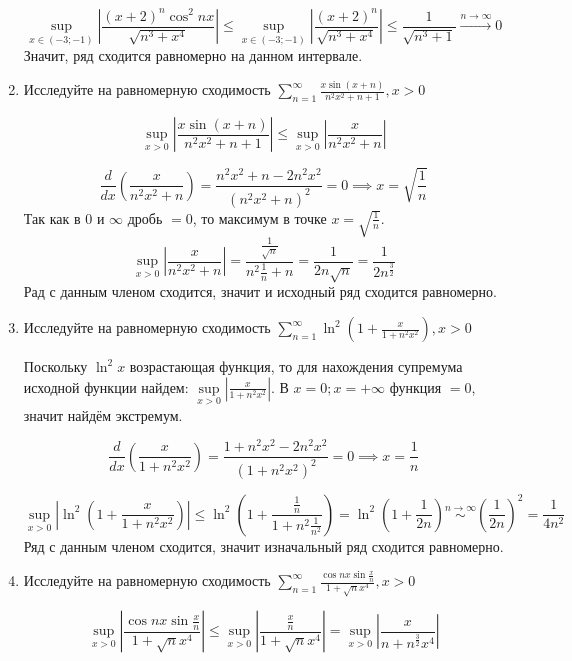\documentclass{article}
\begin{document}
\begin{large}
\begin{enumerate}
$$ \sup_{x\in(-3;-1)} \left| \frac{(x+2)^n \cos^2nx}{\sqrt{n^3 + x^4}} \right| \leq \sup_{x\in(-3;-1)} \left| \frac{(x+2)^n}{\sqrt{n^3 + x^4}} \right| \leq \frac{1}{\sqrt{n^3 + 1}} \xrightarrow{n\to\infty} 0 $$
Значит, ряд сходится равномерно на данном интервале.

\item Исследуйте на равномерную сходимость $ \sum\limits_{n=1}^{\infty} \frac{x \sin(x+n)}{n^2x^2 + n + 1}, x > 0 $

$$ \sup_{x>0} \left| \frac{x \sin(x+n)}{n^2x^2 + n + 1} \right| \leq \sup_{x>0} \left| \frac{x}{n^2x^2 + n} \right| $$

$$ \frac{d}{dx} \left( \frac{x}{n^2x^2 + n} \right) = \frac{n^2x^2 + n - 2n^2x^2}{(n^2x^2 + n)^2} = 0 \implies x = \sqrt{\frac{1}{n}}$$
Так как в $0$ и $\infty$ дробь $= 0$, то максимум в точке $x = \sqrt{\frac{1}{n}}$.
$$ \sup_{x>0} \left| \frac{x}{n^2x^2 + n} \right| = \frac{\frac{1}{\sqrt{n}}}{n^2 \frac{1}{n} + n} = \frac{1}{2n\sqrt{n}} = \frac{1}{2 n^{\frac{3}{2}}}$$
Рад с данным членом сходится, значит и исходный ряд сходится равномерно.

\item Исследуйте на равномерную сходимость $ \sum\limits_{n=1}^{\infty} \ln^{2} \left( 1 + \frac{x}{1+n^2 x^2} \right), x > 0 $

Поскольку $\ln^2 x$ возрастающая функция, то для нахождения супремума исходной функции найдем: $ \sup\limits_{x>0} \left| \frac{x}{1+n^2 x^2} \right| $. В $x = 0; x = +\infty$ функция $= 0$, значит найдём экстремум.

$$ \frac{d}{dx} \left( \frac{x}{1+n^2 x^2} \right)  = \frac{1+n^2 x^2 - 2n^2 x^2}{(1+n^2 x^2)^2} = 0 \implies x = \frac{1}{n} $$

$$ \sup\limits_{x>0} \left| \ln^{2} \left( 1 + \frac{x}{1+n^2 x^2} \right) \right| \leq \ln^2 \left( 1+ \frac{\frac{1}{n}}{1 + n^2 \frac{1}{n^2}} \right) = \ln^2 \left( 1 + \frac{1}{2n} \right) \stackrel{n\to\infty}{\sim} \left( \frac{1}{2n} \right)^2 = \frac{1}{4n^2} $$
Ряд с данным членом сходится, значит изначальный ряд сходится равномерно.

\item Исследуйте на равномерную сходимость $ \sum\limits_{n=1}^{\infty} \frac{\cos nx \sin \frac{x}{n}}{1 + \sqrt{n}x^4}, x > 0 $

$$ \sup_{x>0} \left| \frac{\cos nx \sin \frac{x}{n}}{1 + \sqrt{n}x^4} \right| \leq \sup_{x>0} \left| \frac{\frac{x}{n}}{1 + \sqrt{n}x^4} \right| = \sup_{x>0} \left| \frac{x}{n + n^{\frac{3}{2}}x^4} \right| $$


\end{enumerate}
\end{large}
\end{document}
